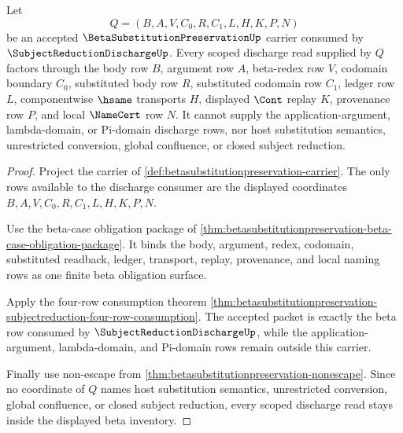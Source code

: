 \begin{theorem}
\label{thm:betasubstitutionpreservation-scoped-discharge-inventory}
Let
$$
Q=(B,A,V,C_0,R,C_1,L,H,K,P,N)
$$
be an accepted $\BetaSubstitutionPreservationUp$ carrier consumed by $\SubjectReductionDischargeUp$. Every scoped discharge read supplied by $Q$ factors through the body row $B$, argument row $A$, beta-redex row $V$, codomain boundary $C_0$, substituted body row $R$, substituted codomain row $C_1$, ledger row $L$, componentwise $\hsame$ transports $H$, displayed $\Cont$ replay $K$, provenance row $P$, and local $\NameCert$ row $N$. It cannot supply the application-argument, lambda-domain, or Pi-domain discharge rows, nor host substitution semantics, unrestricted conversion, global confluence, or closed subject reduction.
\end{theorem}
\begin{proof}
Project the carrier of \autoref{def:betasubstitutionpreservation-carrier}. The only rows available to the discharge consumer are the displayed coordinates $B,A,V,C_0,R,C_1,L,H,K,P,N$.

Use the beta-case obligation package of \autoref{thm:betasubstitutionpreservation-beta-case-obligation-package}. It binds the body, argument, redex, codomain, substituted readback, ledger, transport, replay, provenance, and local naming rows as one finite beta obligation surface.

Apply the four-row consumption theorem \autoref{thm:betasubstitutionpreservation-subjectreduction-four-row-consumption}. The accepted packet is exactly the beta row consumed by $\SubjectReductionDischargeUp$, while the application-argument, lambda-domain, and Pi-domain rows remain outside this carrier.

Finally use non-escape from \autoref{thm:betasubstitutionpreservation-nonescape}. Since no coordinate of $Q$ names host substitution semantics, unrestricted conversion, global confluence, or closed subject reduction, every scoped discharge read stays inside the displayed beta inventory.
\end{proof}

